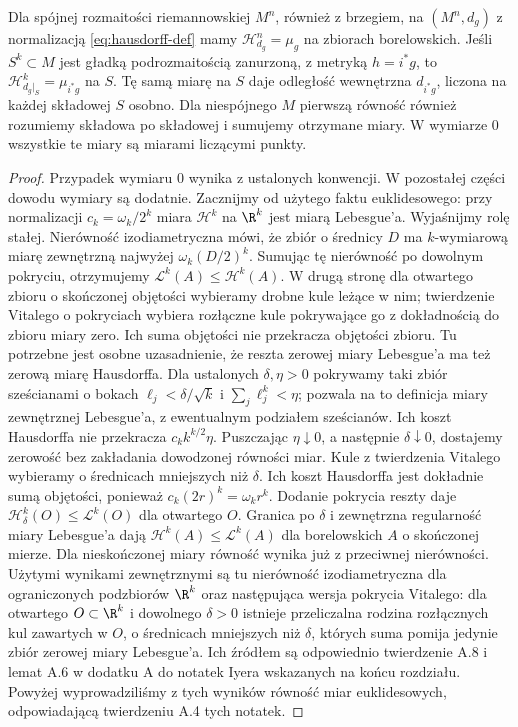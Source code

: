 \begin{twierdzenie}
\label{thm:hausdorff-rownosc}
Dla spójnej rozmaitości riemannowskiej $M^n$, również
z brzegiem, na $(M^n,d_g)$ z normalizacją
\eqref{eq:hausdorff-def} mamy
$\mathcal H^n_{d_g}=\mu_g$
na zbiorach borelowskich.
Jeśli $S^k\subset M$ jest gładką
podrozmaitością zanurzoną, z metryką $h=i^*g$,
to $\mathcal H^k_{d_g|_S}=\mu_{i^*g}$
na $S$. Tę samą miarę na $S$ daje
odległość wewnętrzna $d_{i^*g}$, liczona na każdej
składowej $S$ osobno. Dla niespójnego $M$ pierwszą
równość również rozumiemy składowa po składowej
i sumujemy otrzymane miary. W wymiarze $0$ wszystkie
te miary są miarami liczącymi punkty.
\end{twierdzenie}
\begin{proof}
Przypadek wymiaru $0$ wynika z ustalonych konwencji.
W pozostałej części dowodu wymiary są dodatnie.
Zacznijmy od użytego faktu euklidesowego:
przy normalizacji $c_k=\omega_k/2^k$
miara $\mathcal H^k$ na $\R^k$ jest
miarą Lebesgue'a. Wyjaśnijmy rolę stałej.
Nierówność izodiametryczna mówi, że zbiór
o średnicy $D$ ma $k$-wymiarową miarę
zewnętrzną najwyżej $\omega_k(D/2)^k$.
Sumując tę nierówność po dowolnym
pokryciu, otrzymujemy
$\mathcal L^k(A)\leq\mathcal H^k(A)$.
W drugą stronę dla otwartego zbioru
o skończonej objętości wybieramy drobne
kule leżące w nim; twierdzenie Vitalego
o pokryciach wybiera rozłączne kule
pokrywające go z dokładnością do zbioru
miary zero. Ich suma objętości nie
przekracza objętości zbioru. Tu potrzebne jest
osobne uzasadnienie, że reszta zerowej miary Lebesgue'a
ma też zerową miarę Hausdorffa. Dla ustalonych
$\delta,\eta>0$ pokrywamy taki zbiór sześcianami
o bokach $\ell_j<\delta/\sqrt{k}$ i
$\sum_j\ell_j^k<\eta$; pozwala na to definicja miary
zewnętrznej Lebesgue'a, z ewentualnym podziałem sześcianów.
Ich koszt Hausdorffa nie przekracza
$c_k k^{k/2}\eta$. Puszczając $\eta\downarrow0$,
a następnie $\delta\downarrow0$, dostajemy zerowość
bez zakładania dowodzonej równości miar.
Kule z twierdzenia Vitalego wybieramy o średnicach
mniejszych niż $\delta$. Ich koszt Hausdorffa jest
dokładnie sumą objętości, ponieważ $c_k(2r)^k=\omega_k r^k$.
Dodanie pokrycia reszty daje
$\mathcal H^k_\delta(O)\leq\mathcal L^k(O)$ dla otwartego $O$.
Granica po $\delta$ i zewnętrzna regularność miary
Lebesgue'a dają $\mathcal H^k(A)\leq\mathcal L^k(A)$
dla borelowskich $A$ o skończonej mierze.
Dla nieskończonej miary równość wynika już
z przeciwnej nierówności.
Użytymi wynikami zewnętrznymi są tu nierówność
izodiametryczna dla ograniczonych podzbiorów $\R^k$
oraz następująca wersja pokrycia Vitalego:
dla otwartego $O\subset\R^k$ i dowolnego $\delta>0$
istnieje przeliczalna rodzina rozłącznych kul zawartych
w $O$, o średnicach mniejszych niż $\delta$,
których suma pomija jedynie zbiór zerowej miary Lebesgue'a.
Ich źródłem są odpowiednio twierdzenie A.8 i lemat A.6
w dodatku A do notatek Iyera wskazanych na końcu rozdziału.
Powyżej wyprowadziliśmy z tych wyników równość miar
euklidesowych, odpowiadającą twierdzeniu A.4 tych notatek.


\end{proof}
